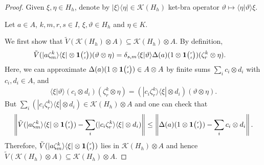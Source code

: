 \documentclass[11pt]{article}
\newcommand{\Grt}[3]{#1{\tiny {\begin{pmatrix} #2\\#3\end{pmatrix}}}}
\newcommand{\UnitC}[2]{\Grt{\mathbf{1}}{#1}{#2}}
\theoremstyle{definition}
\numberwithin{equation}{section}
\begin{document}
 \begin{proof}
   Given $\xi,\eta\in H_{h}$, denote by $|\xi\rangle\langle \eta| \in \mathcal{K}(H_{h})$ ket-bra
   operator $\vartheta \mapsto \langle \eta|\vartheta\rangle \xi$. 

   Let $a\in A$, $k,m,r,s\in I$, $\xi,\vartheta \in H_{h}$ and
   $\eta\in K$. 
   
   We first show that $\tilde V(\mathcal{K}(H_{h})\otimes A) \subseteq
   \mathcal{K}(H_{h}) \otimes A$. By definition,\begin{align*}
     \tilde V(|a\zeta^{k}_{m}\rangle\langle \xi| \otimes \UnitC{r}{s})(\vartheta \otimes \eta) 
     &=     \delta_{s,m} \langle \xi|\vartheta\rangle \Delta(a)(1 \otimes \UnitC{r}{s})(\zeta^{k}_{r}
     \otimes \eta).
   \end{align*} 
   Here, we can approximate $\Delta(a)(1\otimes \UnitC{r}{s}) \in A\otimes A$ by finite sums $\sum_{i} c_{i} \otimes
   d_{i}$ with $c_{i},d_{i} \in A$, and
   \begin{align*}
 \langle \xi|\vartheta\rangle (c_{i} \otimes
d_{i})(\zeta^{k}_{r} \otimes \eta) = 
 (|c_{i}\zeta^{k}_{r}\rangle\langle \xi| \otimes d_{i}) (\vartheta \otimes \eta).
   \end{align*}
But  $\sum_{i} (|c_{i}\zeta^{k}_{r}\rangle\langle \xi| \otimes d_{i}) \in \mathcal{K}(H_{h}) \otimes
A$  and   one can check that
   \begin{align*}
     \left\|\tilde V(|a\zeta^{k}_{m}\rangle\langle \xi| \otimes \UnitC{r}{s}) -      \sum_{i}
       (|c_{i}\zeta^{k}_{r}\rangle\langle \xi| \otimes d_{i})\right\| \leq
     \left\|\Delta(a)(1\otimes \UnitC{r}{s}) -  \sum_{i} c_{i} \otimes
   d_{i}\right\|.
   \end{align*}
   Therefore, $\tilde V(|a\zeta^{k}_{m}\rangle\langle \xi| \otimes \UnitC{r}{s})$ lies in
   $\mathcal{K}(H_{h}) \otimes A$ and hence $\tilde V(\mathcal{K}(H_{h})\otimes A) \subseteq
   \mathcal{K}(H_{h}) \otimes A$.
   


\end{proof}
\end{document}
